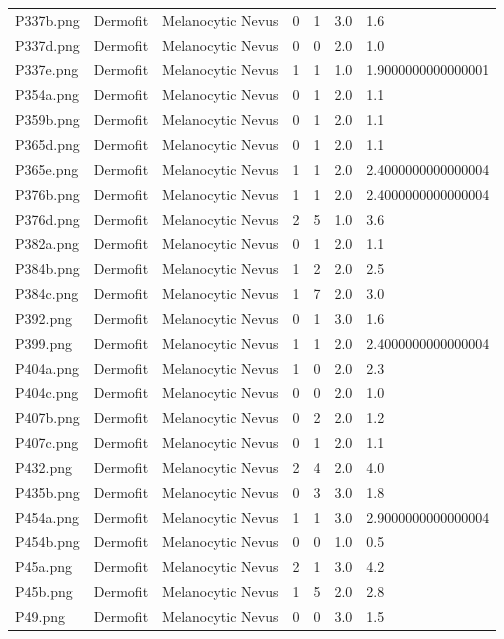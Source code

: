 \begin{longtable}{ | l | l | l | l | l | l | l |}
P337b.png & Dermofit & Melanocytic Nevus & 0 & 1 & 3.0 & 1.6 \\
P337d.png & Dermofit & Melanocytic Nevus & 0 & 0 & 2.0 & 1.0 \\
P337e.png & Dermofit & Melanocytic Nevus & 1 & 1 & 1.0 & 1.9000000000000001 \\
P354a.png & Dermofit & Melanocytic Nevus & 0 & 1 & 2.0 & 1.1 \\
P359b.png & Dermofit & Melanocytic Nevus & 0 & 1 & 2.0 & 1.1 \\
P365d.png & Dermofit & Melanocytic Nevus & 0 & 1 & 2.0 & 1.1 \\
P365e.png & Dermofit & Melanocytic Nevus & 1 & 1 & 2.0 & 2.4000000000000004 \\
P376b.png & Dermofit & Melanocytic Nevus & 1 & 1 & 2.0 & 2.4000000000000004 \\
P376d.png & Dermofit & Melanocytic Nevus & 2 & 5 & 1.0 & 3.6 \\
P382a.png & Dermofit & Melanocytic Nevus & 0 & 1 & 2.0 & 1.1 \\
P384b.png & Dermofit & Melanocytic Nevus & 1 & 2 & 2.0 & 2.5 \\
P384c.png & Dermofit & Melanocytic Nevus & 1 & 7 & 2.0 & 3.0 \\
P392.png & Dermofit & Melanocytic Nevus & 0 & 1 & 3.0 & 1.6 \\
P399.png & Dermofit & Melanocytic Nevus & 1 & 1 & 2.0 & 2.4000000000000004 \\
P404a.png & Dermofit & Melanocytic Nevus & 1 & 0 & 2.0 & 2.3 \\
P404c.png & Dermofit & Melanocytic Nevus & 0 & 0 & 2.0 & 1.0 \\
P407b.png & Dermofit & Melanocytic Nevus & 0 & 2 & 2.0 & 1.2 \\
P407c.png & Dermofit & Melanocytic Nevus & 0 & 1 & 2.0 & 1.1 \\
P432.png & Dermofit & Melanocytic Nevus & 2 & 4 & 2.0 & 4.0 \\
P435b.png & Dermofit & Melanocytic Nevus & 0 & 3 & 3.0 & 1.8 \\
P454a.png & Dermofit & Melanocytic Nevus & 1 & 1 & 3.0 & 2.9000000000000004 \\
P454b.png & Dermofit & Melanocytic Nevus & 0 & 0 & 1.0 & 0.5 \\
P45a.png & Dermofit & Melanocytic Nevus & 2 & 1 & 3.0 & 4.2 \\
P45b.png & Dermofit & Melanocytic Nevus & 1 & 5 & 2.0 & 2.8 \\
P49.png & Dermofit & Melanocytic Nevus & 0 & 0 & 3.0 & 1.5 \\

\end{longtable}
